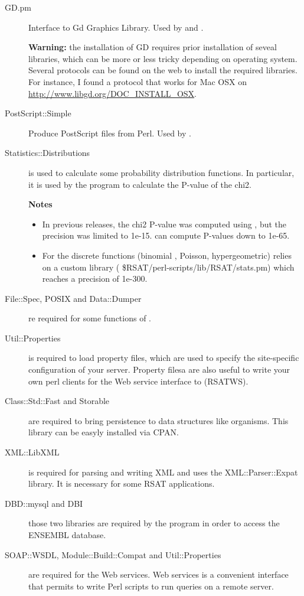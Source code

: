 \documentclass[12pt,a4paper, oneside]{scrreprt} %
\begin{document}
\begin{description}
\item[GD.pm] Interface to Gd Graphics Library. Used by
   and . 

  \textbf{Warning:} the installation of GD requires prior installation
  of seveal libraries, which can be more or less tricky depending on
  operating system. Several protocols can be found on the web to
  install the required libraries. For instance, I found a protocol
  that works for Mac OSX on
  \url{http://www.libgd.org/DOC_INSTALL_OSX}.

\item[PostScript::Simple] Produce PostScript files from Perl. Used by
  .

\item[Statistics::Distributions] is used to calculate some probability
  distribution functions. In particular, it is used by the program
   to calculate the P-value of the
  chi2. 

  \textbf{Notes} 
  \begin{itemize}
  \item In previous releases, the chi2 P-value was computed using
    , but the precision was limited to
    1e-15.  can compute P-values
    down to 1e-65.
  \item For the discrete functions (binomial , Poisson,
    hypergeometric) \RSAT relies on a custom library (
    \$RSAT/perl-scripts/lib/RSAT/stats.pm) which reaches a precision
    of 1e-300.
  \end{itemize}

\item[File::Spec, POSIX and Data::Dumper] re required for some
  functions of .

\item[Util::Properties] is required to load property files, which are
  used to specify the site-specific configuration of your \RSAT
  server. Property filesa are also useful to write your own perl
  clients for the Web service interface to \RSAT (RSATWS).

\item[Class::Std::Fast and Storable] are required to bring persistence
  to data structures like organisms. This library can be easyly
  installed via CPAN.

\item[XML::LibXML] is required for parsing and writing XML and uses
  the XML::Parser::Expat library. It is necessary for some RSAT
  applications.

\item[DBD::mysql and DBI] those two libraries are required by the
  program  in order to access the
  ENSEMBL database.

\item[SOAP::WSDL, Module::Build::Compat and Util::Properties] are
  required for the Web services. \RSAT Web services is a convenient
  interface that permits to write Perl scripts to run \RSAT queries on
  a remote server.

\end{description}
\end{document}
